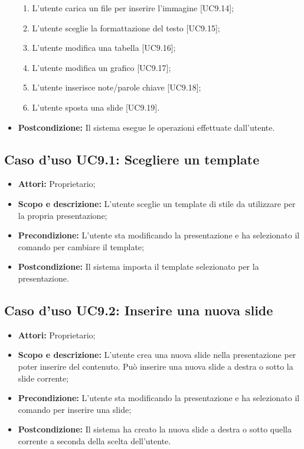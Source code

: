 \begin{itemize}
\begin{enumerate}
		\item L'utente carica un file per inserire l'immagine [UC9.14];

		\item L'utente sceglie la formattazione del testo [UC9.15];

		\item L'utente modifica una tabella [UC9.16];

		\item L'utente modifica un grafico [UC9.17];
		
		\item L'utente inserisce note/parole chiave [UC9.18];
		
		\item L'utente sposta una \gls{slide} [UC9.19].
	\end{enumerate}
	\item \textbf{Postcondizione:} Il sistema esegue le operazioni effettuate dall'utente.
\end{itemize}


\subsection{Caso d'uso UC9.1: Scegliere un template}
\begin{itemize}
	\item \textbf{Attori:} Proprietario;
	\item \textbf{Scopo e descrizione:} L'utente sceglie un \gls{template} di stile da utilizzare per la propria presentazione;
	\item \textbf{Precondizione:} L'utente sta modificando la presentazione e ha selezionato il comando per cambiare il template;
	\item \textbf{Postcondizione:} Il sistema imposta il \gls{template} selezionato per la presentazione.
\end{itemize}


\subsection{Caso d'uso UC9.2: Inserire una nuova slide}
\begin{itemize}
	\item \textbf{Attori:} Proprietario;
	\item \textbf{Scopo e descrizione:} L'utente crea una nuova \gls{slide} nella presentazione per poter inserire del contenuto. Può inserire una nuova slide a destra o sotto la slide corrente;
	\item \textbf{Precondizione:} L'utente sta modificando la presentazione e ha selezionato il comando per inserire una \gls{slide};
	\item \textbf{Postcondizione:} Il sistema ha creato la nuova \gls{slide} a destra o sotto quella corrente a seconda della scelta dell'utente.
\end{itemize}


